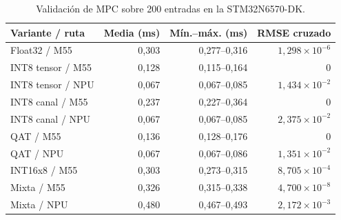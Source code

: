 \begin{table}[H]
\centering\small
\caption{Validación de MPC sobre 200 entradas en la STM32N6570-DK.}\label{tab:mpc_placa}
\begin{tabularx}{\linewidth}{Yrrr}\toprule
Variante / ruta & Media (ms) & Mín.--máx. (ms) & RMSE cruzado\\\midrule
Float32 / M55 & 0,303 & 0,277--0,316 & $1,298\times10^{-6}$\\
INT8 tensor / M55 & 0,128 & 0,115--0,164 & 0\\
INT8 tensor / NPU & 0,067 & 0,067--0,085 & $1,434\times10^{-2}$\\
INT8 canal / M55 & 0,237 & 0,227--0,364 & 0\\
INT8 canal / NPU & 0,067 & 0,067--0,085 & $2,375\times10^{-2}$\\
QAT / M55 & 0,136 & 0,128--0,176 & 0\\
QAT / NPU & 0,067 & 0,067--0,086 & $1,351\times10^{-2}$\\
INT16x8 / M55 & 0,303 & 0,273--0,315 & $8,705\times10^{-4}$\\
Mixta / M55 & 0,326 & 0,315--0,338 & $4,700\times10^{-8}$\\
Mixta / NPU & 0,480 & 0,467--0,493 & $2,172\times10^{-3}$\\
\bottomrule\end{tabularx}
\end{table}
